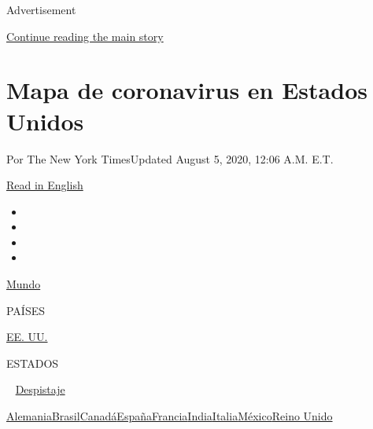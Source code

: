 Advertisement

\protect\hyperlink{after-top}{Continue reading the main story}

\hypertarget{mapa-de-coronavirus-en-estados-unidos}{%
\section{Mapa de coronavirus en Estados
Unidos}\label{mapa-de-coronavirus-en-estados-unidos}}

Por The New York TimesUpdated August 5, 2020, 12:06 A.M. E.T.

\href{https://www.nytimes.com/interactive/2020/us/coronavirus-us-cases.html}{Read
in English}

\begin{itemize}
\item
\item
\item
\item
\end{itemize}

\href{https://www.nytimes.com/interactive/2020/world/coronavirus-maps.html}{Mundo}~

PAÍSES

\textbar{}
\href{https://www.nytimes.com/es/interactive/2020/espanol/mundo/coronavirus-en-estados-unidos.html}{EE.
UU.}~

ESTADOS

~
\href{https://www.nytimes.com/interactive/2020/us/coronavirus-testing.html}{Despistaje}

\href{https://www.nytimes.com/interactive/2020/world/europe/germany-coronavirus-cases.html}{Alemania}\href{https://www.nytimes.com/interactive/2020/world/americas/brazil-coronavirus-cases.html}{Brasil}\href{https://www.nytimes.com/interactive/2020/world/canada/canada-coronavirus-cases.html}{Canadá}\href{https://www.nytimes.com/interactive/2020/world/europe/spain-coronavirus-cases.html}{España}\href{https://www.nytimes.com/interactive/2020/world/europe/france-coronavirus-cases.html}{Francia}\href{https://www.nytimes.com/interactive/2020/world/asia/india-coronavirus-cases.html}{India}\href{https://www.nytimes.com/interactive/2020/world/europe/italy-coronavirus-cases.html}{Italia}\href{https://www.nytimes.com/es/interactive/2020/espanol/america-latina/coronavirus-en-mexico.html}{México}\href{https://www.nytimes.com/interactive/2020/world/europe/united-kingdom-coronavirus-cases.html}{Reino
Unido}

